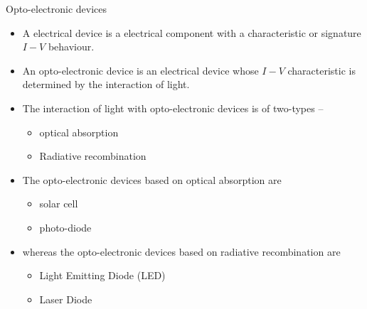 \begin{frame}{Opto-electronic devices}
	\begin{definition}
		\begin{itemize}
			\item 	A electrical device is a electrical component with a characteristic or signature \(I-V\) behaviour.
			\item	An opto-electronic device is an electrical device whose \(I-V\) characteristic is determined by the interaction of light.
		\end{itemize}
	\end{definition}
	\begin{itemize}
		\item The interaction of light with opto-electronic devices is of two-types --
		\begin{itemize}
			\item optical absorption
			\item Radiative recombination
		\end{itemize}
		\item The opto-electronic devices based on optical absorption are
		\begin{itemize}
			\item solar cell
			\item photo-diode
		\end{itemize}
		\item whereas the opto-electronic devices based on radiative recombination are
		\begin{itemize}
			\item Light Emitting Diode (LED)
			\item Laser Diode
		\end{itemize}
	\end{itemize}
\end{frame}
%
